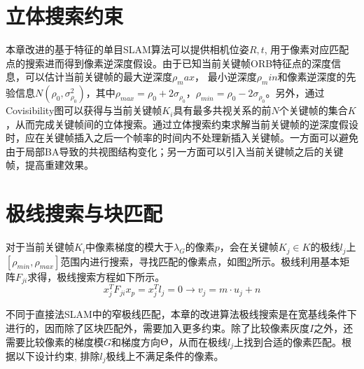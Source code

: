 \begin{figure}
\label{fig1}

\end{figure}





\section{立体搜索约束}
本章改进的基于特征的单目SLAM算法可以提供相机位姿$R,t$, 用于像素对应匹配点的搜索进而得到像素逆深度假设。由于已知当前关键帧ORB特征点的深度信息，可以估计当前关键帧的最大逆深度$\rho_max$， 最小逆深度$\rho_min$和像素逆深度的先验信息$N\left( \rho_0,\sigma_{\rho_0}^2  \right)$，其中$\rho_{max}=\rho_0+2\sigma_{\rho_0}$，$\rho_{min}=\rho_0-2\sigma_{\rho_0}$。另外，通过Covisibility图可以获得与当前关键帧$K_i$具有最多共视关系的前$N$个关键帧的集合$K$，从而完成关键帧间的立体搜索。通过立体搜索约束求解当前关键帧的逆深度假设时，应在关键帧插入之后一个帧率的时间内不处理新插入关键帧。一方面可以避免由于局部BA导致的共视图结构变化；另一方面可以引入当前关键帧之后的关键帧，提高重建效果。


\section{极线搜索与块匹配}
对于当前关键帧$K_i$中像素梯度的模大于$\lambda_G$的像素$p$，会在关键帧$K_j \in K$的极线$l_j$上$\left[ \rho_{min}, \rho_{max} \right]$范围内进行搜索，寻找匹配的像素点，如图\ref{fig4.1}所示。极线利用基本矩阵$F_{ji}$求得，极线搜索方程如下所示。
\begin{equation}
\label{equ4.1}
x_j^T F_{ji}x_p = x^T_jl_j=0 \rightarrow v_j = m \cdot u_j+n
\end{equation}

\begin{figure}
\label{fig4.1}

\end{figure}

不同于直接法SLAM中的窄极线匹配，本章的改进算法极线搜索是在宽基线条件下进行的，因而除了区块匹配外，需要加入更多约束。除了比较像素灰度$I$之外，还需要比较像素的梯度模$G$和梯度方向$\Uptheta$，从而在极线$l_j$上找到合适的像素匹配。根据以下设计约束, 排除$l_j$极线上不满足条件的像素。


